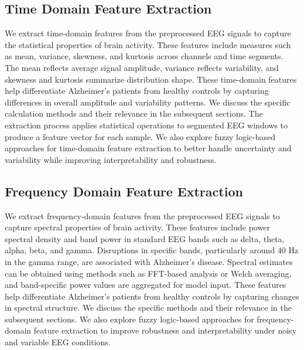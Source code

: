 \documentclass[openany]{book}
\begin{document}
\subsection{Time Domain Feature Extraction}
We extract time-domain features from the preprocessed EEG signals to capture the statistical properties of brain activity. These features include measures such as mean, variance, skewness, and kurtosis across channels and time segments. The mean reflects average signal amplitude, variance reflects variability, and skewness and kurtosis summarize distribution shape. These time-domain features help differentiate Alzheimer's patients from healthy controls by capturing differences in overall amplitude and variability patterns. We discuss the specific calculation methods and their relevance in the subsequent sections. The extraction process applies statistical operations to segmented EEG windows to produce a feature vector for each sample. We also explore fuzzy logic-based approaches for time-domain feature extraction to better handle uncertainty and variability while improving interpretability and robustness.
\subsection{Frequency Domain Feature Extraction}
We extract frequency-domain features from the preprocessed EEG signals to capture spectral properties of brain activity. These features include power spectral density and band power in standard EEG bands such as delta, theta, alpha, beta, and gamma. Disruptions in specific bands, particularly around 40 Hz in the gamma range, are associated with Alzheimer's disease. Spectral estimates can be obtained using methods such as FFT-based analysis or Welch averaging, and band-specific power values are aggregated for model input. These features help differentiate Alzheimer's patients from healthy controls by capturing changes in spectral structure. We discuss the specific methods and their relevance in the subsequent sections. We also explore fuzzy logic-based approaches for frequency-domain feature extraction to improve robustness and interpretability under noisy and variable EEG conditions.
\end{document}
